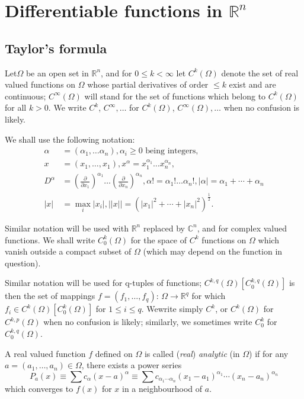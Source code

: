 \chapter{Differentiable functions in $\mathbb{R}^n$}\label{chap1}%

\section{Taylor's formula}\label{chap1:sec1}

Let\pageoriginale $\Omega$ be an open set in $\mathbb{R}^n$, and for $0 \leq k <
\infty$ let $C^k(\Omega)$ denote the set of real valued functions on
$\Omega$ whose partial derivatives of order $\leq k$ exist and are
continuous; $C^{\infty}(\Omega)$ will stand for the set of functions
which belong to $C^{k}(\Omega)$ for all $k > 0$. We write $C^k$,
$C^{\infty}, \ldots$ for $C^k(\Omega)$, $C^{\infty}(\Omega), \ldots$
when no confusion is likely. 

We shall use the following notation:
\begin{align*}
  \alpha & = (\alpha_1, \ldots \alpha_n), \alpha_i \geq 0 \text{ being
    integers, }\\ 
  x &= (x_1, \ldots, x_1), x^{\alpha} = x^{\alpha_1}_1 \ldots x^{\alpha_n}_n,\\
  D^{\alpha}& = \left(\frac{\partial}{\partial x_1}\right)^{\alpha_1} \ldots
  \left(\frac{\partial}{\partial x_n}\right)^{\alpha_n},\alpha ! =
  \alpha_1 ! \ldots 
  \alpha_n !, |\alpha| = \alpha_1+ \cdots + \alpha_n\\ 
  |x| &= \max \limits_i |x_i| , ||x|| = (|x_1|^2 + \cdots +
  |x_n|^2)^{\frac{1}{2}}.  
\end{align*}

Similar notation will be used with $\mathbb{R}^n$ replaced by
$\mathbb{C}^n$, and for complex valued functions. We shall write
$C^k_0 (\Omega)$ for the space of $C^k$ functions on $\Omega$ which
vanish outside a compact subset of $\Omega$ (which may depend on the
function in question). 

Similar notation will be used for q-tuples of functions; $C^{k,
  q}(\Omega )[C^{k, q}_0 (\Omega)]$ is then the set of mappings $f =
(f_1, \ldots, f_q)$: $\Omega \to \mathbb{R}^q$ for which $f_i \in
C^k(\Omega) [C^k_0 (\Omega)]$ for $1 \leq i \leq q$. We\pageoriginale write simply
$C^k$, or $C^k(\Omega)$ for $C^{k, p}(\Omega)$ when no confusion is
likely; similarly, we sometimes write $C^k_0$ for $C^{k, q}_0
(\Omega)$. 

A real valued function $f$ defined on $\Omega$ is called (\textit{real})
  \textit{analytic} (in $\Omega$) if for any $a= (a_1, \ldots , a_n) \in
\Omega$, there exists a power series  
$$
P_a(x) \equiv \sum c_{\alpha}(x-a)^{\alpha} \equiv \sum c_{\alpha_1
\cdots \alpha_n} (x_1 - a_1)^{\alpha_1} \cdots (x_n - a_n)^{\alpha_n} 
$$
which converges to $f(x)$ for $x$ in a neighbourhood of $a$.


